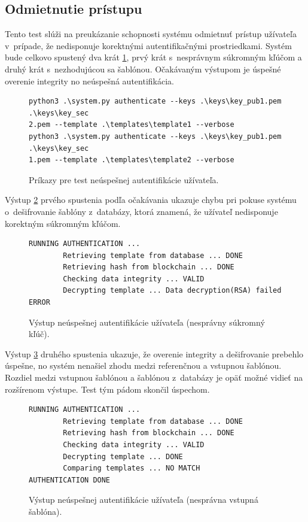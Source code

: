 \subsection{Odmietnutie prístupu}
Tento test slúži na preukázanie schopnosti systému odmietnuť prístup užívateľa v~prípade, že nedisponuje korektnými autentifikačnými prostriedkami. Systém bude celkovo spustený dva krát \ref{terminal4}, prvý krát s~nesprávnym súkromným kľúčom a druhý krát s~nezhodujúcou sa šablónou. Očakávaným výstupom je úspešné overenie integrity no neúspešná autentifikácia.

\begin{figure}[hbt]
\renewcommand\figurename{Výpis kódu}
\begin{Verbatim}[frame=single]
python3 .\system.py authenticate --keys .\keys\key_pub1.pem .\keys\key_sec
2.pem --template .\templates\template1 --verbose
python3 .\system.py authenticate --keys .\keys\key_pub1.pem .\keys\key_sec
1.pem --template .\templates\template2 --verbose
\end{Verbatim}
    \caption{Príkazy pre test neúspešnej autentifikácie užívateľa.}
	\label{terminal4}
\end{figure}

Výstup \ref{terminal5} prvého spustenia podľa očakávania ukazuje chybu pri pokuse systému o~dešifrovanie šablóny z~databázy, ktorá znamená, že užívateľ nedisponuje korektným súkromným kľúčom.
\begin{figure}[hbt]
\renewcommand\figurename{Výpis kódu}
\begin{Verbatim}[frame=single]
RUNNING AUTHENTICATION ...
        Retrieving template from database ... DONE
        Retrieving hash from blockchain ... DONE
        Checking data integrity ... VALID
        Decrypting template ... Data decryption(RSA) failed
ERROR
\end{Verbatim}
    \caption{Výstup neúspešnej autentifikácie užívateľa (nesprávny súkromný kľúč).}
	\label{terminal5}
\end{figure}

Výstup \ref{terminal6} druhého spustenia ukazuje, že overenie integrity a dešifrovanie prebehlo úspešne, no systém nenašiel zhodu medzi referenčnou a vstupnou šablónou. Rozdiel medzi vstupnou šablónou a šablónou z~databázy je opäť možné vidieť na rozšírenom výstupe. Test tým pádom skončil úspechom.
\begin{figure}[hbt]
\renewcommand\figurename{Výpis kódu}
\begin{Verbatim}[frame=single]
RUNNING AUTHENTICATION ...
        Retrieving template from database ... DONE
        Retrieving hash from blockchain ... DONE
        Checking data integrity ... VALID
        Decrypting template ... DONE
        Comparing templates ... NO MATCH
AUTHENTICATION DONE
\end{Verbatim}
    \caption{Výstup neúspešnej autentifikácie užívateľa (nesprávna vstupná šablóna).}
	\label{terminal6}
\end{figure}

